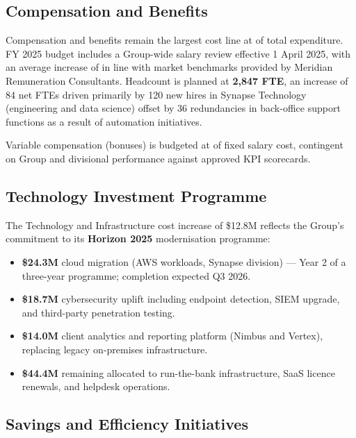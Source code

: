 \vspace{8pt}

\subsection{Compensation and Benefits}

Compensation and benefits remain the largest cost line at  of total
expenditure. FY 2025 budget includes a Group-wide salary review effective 1 April 2025,
with an average increase of  in line with market benchmarks provided by
Meridian Remuneration Consultants. Headcount is planned at \textbf{2,847 FTE}, an
increase of 84 net FTEs driven primarily by 120 new hires in Synapse Technology
(engineering and data science) offset by 36 redundancies in back-office support
functions as a result of automation initiatives.

Variable compensation (bonuses) is budgeted at  of fixed salary cost,
contingent on Group and divisional performance against approved KPI scorecards.

\subsection{Technology Investment Programme}

The Technology and Infrastructure cost increase of \$12.8M reflects the Group's
commitment to its \textbf{Horizon 2025} modernisation programme:

\begin{itemize}
  \item \textbf{\$24.3M} cloud migration (AWS workloads, Synapse division) — Year 2
        of a three-year programme; completion expected Q3 2026.
  \item \textbf{\$18.7M} cybersecurity uplift including endpoint detection, SIEM
        upgrade, and third-party penetration testing.
  \item \textbf{\$14.0M} client analytics and reporting platform (Nimbus and
        Vertex), replacing legacy on-premises infrastructure.
  \item \textbf{\$44.4M} remaining allocated to run-the-bank infrastructure,
        SaaS licence renewals, and helpdesk operations.
\end{itemize}

\subsection{Savings and Efficiency Initiatives}

